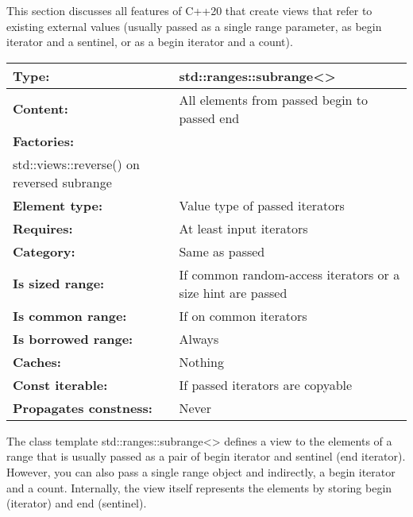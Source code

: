 
This section discusses all features of C++20 that create views that refer to existing external values (usually passed as a single range parameter, as begin iterator and a sentinel, or as a begin iterator and a count).


\begin{longtable}[c]{|l|l|}
	\hline
	\textbf{Type:}                 & std::ranges::subrange\textless{}\textgreater{} \\ \hline
	\endfirsthead
	\endhead
	\textbf{Content:}              & All elements from passed begin to passed end   \\ \hline
	\textbf{Factories:}      & \begin{tabular}[c]{@{}l@{}}std::views::counted()\\ std::views::reverse() on reversed subrange\end{tabular} \\ \hline
	\textbf{Element type:}         & Value type of passed iterators                 \\ \hline
	\textbf{Requires:}             & At least input iterators                       \\ \hline
	\textbf{Category:}             & Same as passed                                 \\ \hline
	\textbf{Is sized range:} & If common random-access iterators or a size hint are passed                                                \\ \hline
	\textbf{Is common range:}      & If on common iterators                         \\ \hline
	\textbf{Is borrowed range:}    & Always                                         \\ \hline
	\textbf{Caches:}               & Nothing                                        \\ \hline
	\textbf{Const iterable:}       & If passed iterators are copyable               \\ \hline
	\textbf{Propagates constness:} & Never                                          \\ \hline
\end{longtable}

The class template std::ranges::subrange<> defines a view to the elements of a range that is usually passed as a pair of begin iterator and sentinel (end iterator). However, you can also pass a single range object and indirectly, a begin iterator and a count. Internally, the view itself represents the elements by storing begin (iterator) and end (sentinel).

